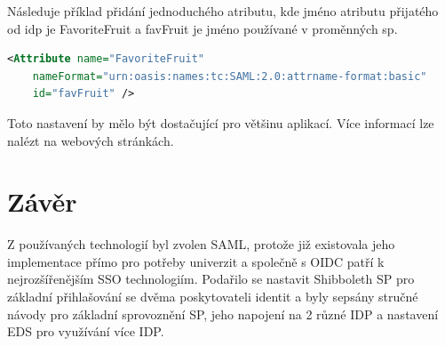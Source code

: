 Následuje příklad přidání jednoduchého atributu, kde jméno atributu přijatého od idp je FavoriteFruit a favFruit je jméno používané v proměnných sp\cite{AddAttribute}.
 \begin{lstlisting}[language=XML]
     <Attribute name="FavoriteFruit"
    nameFormat="urn:oasis:names:tc:SAML:2.0:attrname-format:basic"
    id="favFruit" />
    \end{lstlisting}
    
Toto nastavení by mělo být dostačující pro většinu aplikací. Více informací lze nalézt na webových stránkách\cite{AddAttribute}.

\chapter{Závěr}
Z používaných technologií byl zvolen SAML, protože již existovala jeho implementace přímo pro potřeby univerzit a společně s OIDC patří k nejrozšířenějším SSO technologiím.
Podařilo se nastavit Shibboleth SP pro základní přihlašování se dvěma poskytovateli identit a byly sepsány stručné návody pro základní sprovoznění SP, jeho napojení na 2 různé IDP a nastavení EDS pro využívání více IDP.

\label{zaver}






